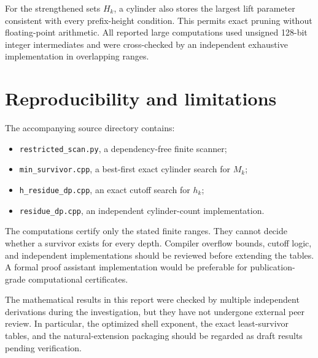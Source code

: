 \documentclass[11pt,reqno]{amsart}
\theoremstyle{plain}
\theoremstyle{definition}
\numberwithin{equation}{section}
\begin{document}
For the strengthened sets $H_k$, a cylinder also stores the largest lift
parameter consistent with every prefix-height condition.  This permits exact
pruning without floating-point arithmetic.  All reported large computations
used unsigned 128-bit integer intermediates and were cross-checked by an
independent exhaustive implementation in overlapping ranges.

\section{Reproducibility and limitations}
\label{app:repro}

The accompanying source directory contains:
\begin{itemize}
  \item \texttt{restricted\_scan.py}, a dependency-free finite scanner;
  \item \texttt{min\_survivor.cpp}, a best-first exact cylinder search for
        $M_k$;
  \item \texttt{h\_residue\_dp.cpp}, an exact cutoff search for $h_k$;
  \item \texttt{residue\_dp.cpp}, an independent cylinder-count
        implementation.
\end{itemize}

The computations certify only the stated finite ranges.  They cannot decide
whether a survivor exists for every depth.  Compiler overflow bounds, cutoff
logic, and independent implementations should be reviewed before extending
the tables.  A formal proof assistant implementation would be preferable for
publication-grade computational certificates.

The mathematical results in this report were checked by multiple independent
derivations during the investigation, but they have not undergone external
peer review.  In particular, the optimized shell exponent, the exact
least-survivor tables, and the natural-extension packaging should be regarded
as draft results pending verification.

\printbibliography[title={References}]
\end{document}
